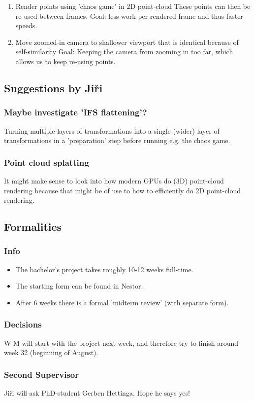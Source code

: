\documentclass[11pt]{article}
\begin{document}
\begin{enumerate}
\item Render points using 'chaos game' in 2D point-cloud
\label{sec:orga4b4c97}
These points can then be re-used between frames.
Goal: less work per rendered frame and thus faster speeds.

\item Move zoomed-in camera to shallower viewport that is identical because of self-similarity
\label{sec:orgccf2714}
Goal: Keeping the camera from zooming in too far, which allows us to keep re-using points.
\end{enumerate}

\subsection{Suggestions by Jiři}
\label{sec:org49cfda1}
\subsubsection{Maybe investigate 'IFS flattening'?}
\label{sec:orgf005aea}
Turning multiple layers of transformations into a single (wider) layer of transformations
in a 'preparation' step before running e.g. the chaos game.

\subsubsection{Point cloud splatting}
\label{sec:org45e7abb}
It might make sense to look into how modern GPUs do (3D) point-cloud rendering
because that might be of use to how to efficiently do 2D point-cloud rendering.

\subsection{Formalities}
\label{sec:org3a9b6b4}
\subsubsection{Info}
\label{sec:org1c06ad1}
\begin{itemize}
\item The bachelor's project takes roughly 10-12 weeks full-time.
\item The starting form can be found in Nestor.
\item After 6 weeks there is a formal 'midterm review' (with separate form).
\end{itemize}

\subsubsection{Decisions}
\label{sec:org58322c6}

W-M will start with the project next week, and therefore try to finish around week 32 (beginning of August).

\subsubsection{Second Supervisor}
\label{sec:org75d7dea}

Jiři will ask PhD-student Gerben Hettinga. Hope he says yes!
\end{document}
